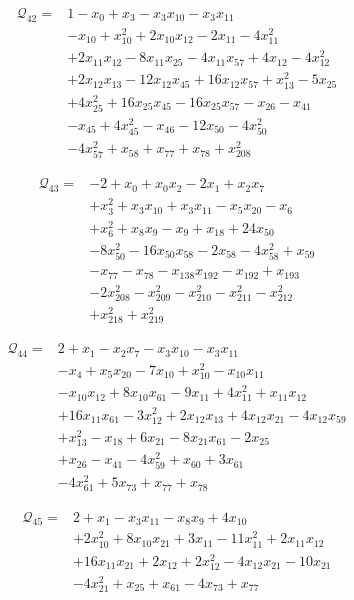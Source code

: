 \begin{align*}
\mathcal{Q}_{42}={}&1-x_{0}+x_{3}-x_{3}x_{10}-x_{3}x_{11}\\
&-x_{10}+x_{10}^{2}+2x_{10}x_{12}-2x_{11}-4x_{11}^{2}\\
&+2x_{11}x_{12}-8x_{11}x_{25}-4x_{11}x_{57}+4x_{12}-4x_{12}^{2}\\
&+2x_{12}x_{13}-12x_{12}x_{45}+16x_{12}x_{57}+x_{13}^{2}-5x_{25}\\
&+4x_{25}^{2}+16x_{25}x_{45}-16x_{25}x_{57}-x_{26}-x_{41}\\
&-x_{45}+4x_{45}^{2}-x_{46}-12x_{50}-4x_{50}^{2}\\
&-4x_{57}^{2}+x_{58}+x_{77}+x_{78}+x_{208}^{2}
\end{align*}

\begin{align*}
\mathcal{Q}_{43}={}&-2+x_{0}+x_{0}x_{2}-2x_{1}+x_{2}x_{7}\\
&+x_{3}^{2}+x_{3}x_{10}+x_{3}x_{11}-x_{5}x_{20}-x_{6}\\
&+x_{6}^{2}+x_{8}x_{9}-x_{9}+x_{18}+24x_{50}\\
&-8x_{50}^{2}-16x_{50}x_{58}-2x_{58}-4x_{58}^{2}+x_{59}\\
&-x_{77}-x_{78}-x_{138}x_{192}-x_{192}+x_{193}\\
&-2x_{208}^{2}-x_{209}^{2}-x_{210}^{2}-x_{211}^{2}-x_{212}^{2}\\
&+x_{218}^{2}+x_{219}^{2}
\end{align*}

\begin{align*}
\mathcal{Q}_{44}={}&2+x_{1}-x_{2}x_{7}-x_{3}x_{10}-x_{3}x_{11}\\
&-x_{4}+x_{5}x_{20}-7x_{10}+x_{10}^{2}-x_{10}x_{11}\\
&-x_{10}x_{12}+8x_{10}x_{61}-9x_{11}+4x_{11}^{2}+x_{11}x_{12}\\
&+16x_{11}x_{61}-3x_{12}^{2}+2x_{12}x_{13}+4x_{12}x_{21}-4x_{12}x_{59}\\
&+x_{13}^{2}-x_{18}+6x_{21}-8x_{21}x_{61}-2x_{25}\\
&+x_{26}-x_{41}-4x_{59}^{2}+x_{60}+3x_{61}\\
&-4x_{61}^{2}+5x_{73}+x_{77}+x_{78}
\end{align*}

\begin{align*}
\mathcal{Q}_{45}={}&2+x_{1}-x_{3}x_{11}-x_{8}x_{9}+4x_{10}\\
&+2x_{10}^{2}+8x_{10}x_{21}+3x_{11}-11x_{11}^{2}+2x_{11}x_{12}\\
&+16x_{11}x_{21}+2x_{12}+2x_{12}^{2}-4x_{12}x_{21}-10x_{21}\\
&-4x_{21}^{2}+x_{25}+x_{61}-4x_{73}+x_{77}
\end{align*}


